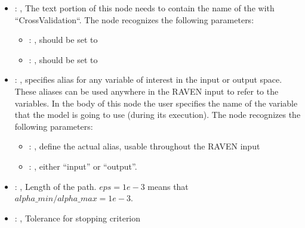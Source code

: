 \begin{itemize}
\begin{itemize}
        \item {}: ,
          List of IDs of features/variables to include in the transformation process.

        \item {}: ,
          Which space to search? Target or Feature?
      \end{itemize}

    \item {}: ,
      The text portion of this node needs to contain the name of the  with
               ``CrossValidation``.
      The  node recognizes the following parameters:
        \begin{itemize}
          \item {}: ,
            should be set to 
          \item {}: ,
            should be set to 
      \end{itemize}

    \item {}: ,
      specifies alias for         any variable of interest in the input or output space. These
      aliases can be used anywhere in the RAVEN input to         refer to the variables. In the body
      of this node the user specifies the name of the variable that the model is going to use
      (during its execution).
      The  node recognizes the following parameters:
        \begin{itemize}
          \item {}: ,
            define the actual alias, usable throughout the RAVEN input
          \item {}: ,
            either ``input'' or ``output''.
      \end{itemize}

    \item {}: ,
      Length of the path. $eps=1e-3$ means that $alpha\_min / alpha\_max = 1e-3$.

    \item {}: ,
      Tolerance for stopping criterion


\end{itemize}
